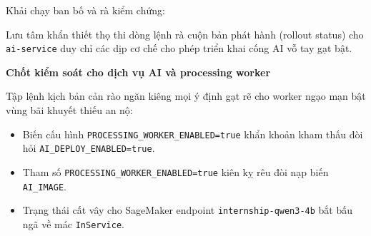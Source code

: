 Khải chạy ban bố và rà kiểm chứng:

\begin{Shaded}
\begin{Highlighting}[]
\OperatorTok{=}
\OperatorTok{=}
\OperatorTok{=}
\OperatorTok{=}
\OperatorTok{=}
\end{Highlighting}
\end{Shaded}

Lưu tâm khẩn thiết thọ thi dòng lệnh rà cuộn bản phát hành (rollout
status) cho \texttt{ai-\allowbreak{}service} duy chỉ các dịp cơ chế cho phép triển
khai cống AI vỗ tay gạt bật.

\vspace{0.5em}\noindent\textbf{Chốt kiểm soát cho dịch vụ AI và processing
worker}\par

Tập lệnh kịch bản cản rào ngăn kiêng mọi ý định gạt rẽ cho worker ngạo
mạn bật vùng bãi khuyết thiếu an nộ:

\begin{itemize}
\tightlist
\item
  Biến cấu hình \texttt{PROCESSING\_\allowbreak{}WORKER\_\allowbreak{}ENABLED=true} khẩn khoản
  kham thấu đòi hỏi \texttt{AI\_\allowbreak{}DEPLOY\_\allowbreak{}ENABLED=true}.
\item
  Tham số \texttt{PROCESSING\_\allowbreak{}WORKER\_\allowbreak{}ENABLED=true} kiên kỵ rêu đòi nạp
  biến \texttt{AI\_\allowbreak{}IMAGE}.
\item
  Trạng thái cất vây cho SageMaker endpoint \texttt{internship-\allowbreak{}qwen3-\allowbreak{}4b}
  bắt bấu ngã về mác \texttt{InService}.
\end{itemize}


